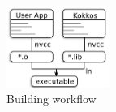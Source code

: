 
\begin{figure}
\centerline{\includegraphics[width=0.3\textwidth]{img/Build.png}}
\caption{Building workflow}
\label{fig}
\end{figure}